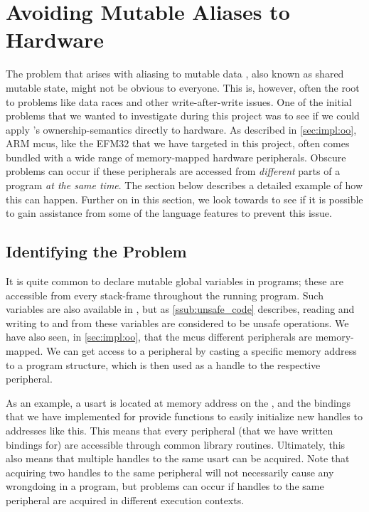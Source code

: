 
\section{Avoiding Mutable Aliases to Hardware}
\label{sec:ownership_allied_to_hardware}

The problem that arises with aliasing to mutable data \cite{web:problem_with_shared_mutability}, also known as shared mutable state, might not be obvious to everyone.
This is, however, often the root to problems like data races and other write-after-write issues.
One of the initial problems that we wanted to investigate during this project was to see if we could apply {\rust}'s ownership-semantics directly to hardware.
As described in \autoref{sec:impl:oo}, ARM \glspl{mcu}, like the EFM32 that we have targeted in this project, often comes bundled with a wide range of memory-mapped hardware peripherals.
Obscure problems can occur if these peripherals are accessed from \emph{different} parts of a program \emph{at the same time}.
The section below describes a detailed example of how this can happen.
Further on in this section, we look towards {\rust} to see if it is possible to gain assistance from some of the language features to prevent this issue.

\subsection{Identifying the Problem}

It is quite common to declare mutable global variables in {\C} programs; these are accessible from every stack-frame throughout the running program.
Such variables are also available in {\rust}, but as \autoref{ssub:unsafe_code} describes, reading and writing to and from these variables are considered to be unsafe operations.
We have also seen, in \autoref{sec:impl:oo}, that the \glspl{mcu} different peripherals are memory-mapped.
We can get access to a peripheral by casting a specific memory address to a program structure, which is then used as a handle to the respective peripheral.

As an example, a \gls{usart} is located at memory address  on the {\gecko}, and the bindings that we have implemented for {\emlib} provide functions to easily initialize new handles to addresses like this.
This means that every peripheral (that we have written bindings for) are accessible through common library routines.
Ultimately, this also means that multiple handles to the same \gls{usart} can be acquired.
Note that acquiring two handles to the same peripheral will not necessarily cause any wrongdoing in a program, but problems can occur if handles to the same peripheral are acquired in different execution contexts.


